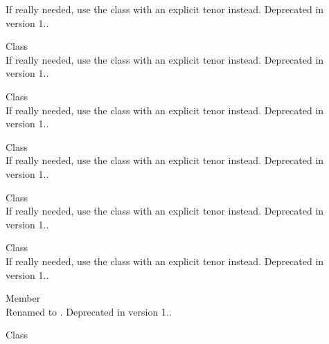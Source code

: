 \begin{DoxyRefList}
\label{deprecated__deprecated000052}%
%
If really needed, use the  class with an explicit tenor instead. Deprecated in version 1..  
\item[Class \doxylink{class_quant_lib_1_1_euribor4_m}{Quant\+Lib\+::Euribor4M} ]\hfill \\
\label{deprecated__deprecated000054}%
%
If really needed, use the  class with an explicit tenor instead. Deprecated in version 1..  
\item[Class \doxylink{class_quant_lib_1_1_euribor5_m}{Quant\+Lib\+::Euribor5M} ]\hfill \\
\label{deprecated__deprecated000055}%
%
If really needed, use the  class with an explicit tenor instead. Deprecated in version 1..  
\item[Class \doxylink{class_quant_lib_1_1_euribor7_m}{Quant\+Lib\+::Euribor7M} ]\hfill \\
\label{deprecated__deprecated000056}%
%
If really needed, use the  class with an explicit tenor instead. Deprecated in version 1..  
\item[Class \doxylink{class_quant_lib_1_1_euribor8_m}{Quant\+Lib\+::Euribor8M} ]\hfill \\
\label{deprecated__deprecated000057}%
%
If really needed, use the  class with an explicit tenor instead. Deprecated in version 1..  
\item[Class \doxylink{class_quant_lib_1_1_euribor9_m}{Quant\+Lib\+::Euribor9M} ]\hfill \\
\label{deprecated__deprecated000058}%
%
If really needed, use the  class with an explicit tenor instead. Deprecated in version 1..  
\item[Member \doxylink{namespace_quant_lib_a3a5807953ebd18abd721601217d3a62e}{Quant\+Lib\+::Euribor\+SW} ]\hfill \\
\label{deprecated__deprecated000050}%
%
Renamed to . Deprecated in version 1..  
\item[Class \doxylink{class_quant_lib_1_1_e_u_r_libor10_m}{Quant\+Lib\+::EURLibor10M} ]\hfill \\

\end{DoxyRefList}
